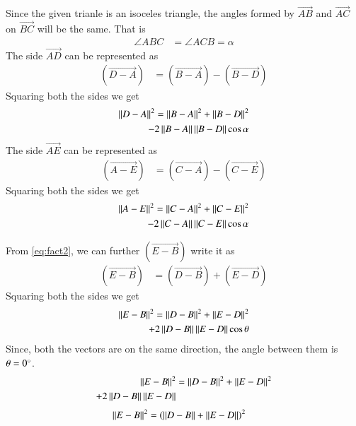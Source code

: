\documentclass[journal,12pt,twocolumn]{IEEEtran}
\begin{document}
	Since the given trianle is an isoceles triangle, the angles formed by $\vec{AB}$ and $\vec{AC}$ on $\vec{BC}$ will be the same. That is
	\begin{align}\label{eq:fact3}
		\angle ABC &= \angle ACB = \alpha
	\end{align}
	The side $\vec{AD}$ can be represented as 
	\begin{align}\label{eq:eq1}
		(\vec{D-A}) &= (\vec{B-A}) - (\vec{B-D})
	\end{align}
	Squaring both the sides we get	
	\begin{align} \label{eq:eq2}
		\left\lVert D-A\right\rVert^{2} = \left\lVert B-A\right\rVert^{2} + \left\lVert B-D\right\rVert^{2} \nonumber \\ - 2\left\lVert B-A\right\rVert\left\lVert B-D\right\rVert\cos\alpha
	\end{align}
	The side $\vec{AE}$ can be represented as 
	\begin{align}\label{eq:eq3}
		(\vec{A-E}) &= (\vec{C-A}) - (\vec{C-E})
	\end{align}
	Squaring both the sides we get	
	\begin{align} \label{eq:eq4}
		\left\lVert A-E\right\rVert^{2} = \left\lVert C-A\right\rVert^{2} + \left\lVert C-E\right\rVert^{2} \nonumber \\  - 2\left\lVert C-A\right\rVert\left\lVert C-E\right\rVert\cos\alpha
	\end{align}
	
	From \eqref{eq:fact2}, we can further $(\vec{E-B})$ write it as 
	\begin{align}\label{eq:eq5}
		(\vec{E-B}) &= (\vec{D-B}) + (\vec{E-D})
	\end{align}
	Squaring both the sides we get
	\begin{align} \label{eq:eq6}
		\left\lVert E-B\right\rVert^{2} = \left\lVert D-B\right\rVert^{2} + \left\lVert E-D\right\rVert^{2} \nonumber \\ + 2\left\lVert D-B\right\rVert\left\lVert E-D\right\rVert\cos\theta
	\end{align}
	Since, both the vectors are on the same direction, the angle between them is $\theta = 0\degree$.
	\begin{align} \label{eq:eq7}
		\left\lVert E-B\right\rVert^{2} &= \left\lVert D-B\right\rVert^{2} + \left\lVert E-D\right\rVert^{2} \nonumber \\ + 2\left\lVert D-B\right\rVert\left\lVert E-D\right\rVert
	\end{align}
	\begin{align}\label{eq:eq8}
		\left\lVert E-B\right\rVert^{2} &= \left(\left\lVert D-B\right\rVert + \left\lVert E-D\right\rVert\right)^{2}
	\end{align}
\end{document}
